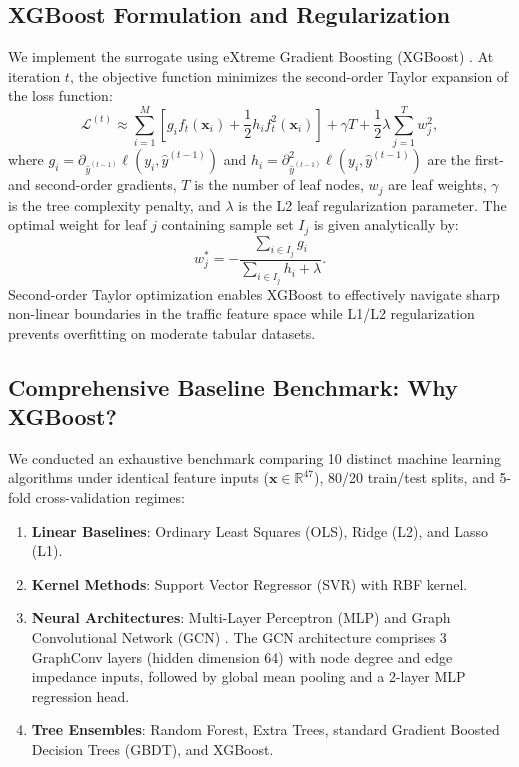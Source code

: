 \documentclass[journal]{IEEEtran}
\begin{document}
\subsection{XGBoost Formulation and Regularization}
We implement the surrogate using eXtreme Gradient Boosting (XGBoost) \cite{Chen2016}. At iteration $t$, the objective function minimizes the second-order Taylor expansion of the loss function:
\begin{equation}
\mathcal{L}^{(t)} \approx \sum_{i=1}^{M} \left[ g_i f_t(\mathbf{x}_i) + \frac{1}{2} h_i f_t^2(\mathbf{x}_i) \right] + \gamma T + \frac{1}{2} \lambda \sum_{j=1}^T w_j^2,
\end{equation}
where $g_i = \partial_{\hat{y}^{(t-1)}} \ell(y_i, \hat{y}^{(t-1)})$ and $h_i = \partial_{\hat{y}^{(t-1)}}^2 \ell(y_i, \hat{y}^{(t-1)})$ are the first- and second-order gradients, $T$ is the number of leaf nodes, $w_j$ are leaf weights, $\gamma$ is the tree complexity penalty, and $\lambda$ is the L2 leaf regularization parameter. The optimal weight for leaf $j$ containing sample set $I_j$ is given analytically by:
\begin{equation}
w_j^* = - \frac{\sum_{i \in I_j} g_i}{\sum_{i \in I_j} h_i + \lambda}.
\end{equation}
Second-order Taylor optimization enables XGBoost to effectively navigate sharp non-linear boundaries in the traffic feature space while L1/L2 regularization prevents overfitting on moderate tabular datasets.

\subsection{Comprehensive Baseline Benchmark: Why XGBoost?}
We conducted an exhaustive benchmark comparing 10 distinct machine learning algorithms under identical feature inputs ($\mathbf{x} \in \mathbb{R}^{47}$), 80/20 train/test splits, and 5-fold cross-validation regimes:
\begin{enumerate}
    \item \textbf{Linear Baselines}: Ordinary Least Squares (OLS), Ridge (L2), and Lasso (L1).
    \item \textbf{Kernel Methods}: Support Vector Regressor (SVR) with RBF kernel.
    \item \textbf{Neural Architectures}: Multi-Layer Perceptron (MLP) and Graph Convolutional Network (GCN) \cite{Kipf2017}. The GCN architecture comprises 3 GraphConv layers (hidden dimension 64) with node degree and edge impedance inputs, followed by global mean pooling and a 2-layer MLP regression head.
    \item \textbf{Tree Ensembles}: Random Forest, Extra Trees, standard Gradient Boosted Decision Trees (GBDT), and XGBoost.
\end{enumerate}
\end{document}
